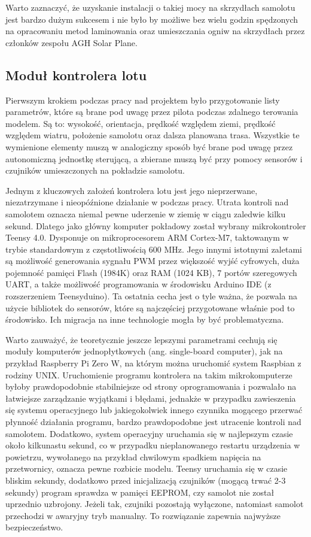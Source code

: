 \documentclass[12pt, a4paper]{article}
\begin{document}
Warto zaznaczyć, że uzyskanie instalacji o takiej mocy na skrzydłach samolotu jest bardzo dużym sukcesem i nie było by możliwe bez wielu godzin spędzonych na opracowaniu metod laminowania oraz umieszczania ogniw na skrzydłach przez członków zespołu AGH Solar Plane.

\FloatBarrier
\subsection{Moduł kontrolera lotu}
Pierwszym krokiem podczas pracy nad projektem  było przygotowanie listy parametrów, które są brane pod uwagę przez pilota podczas zdalnego terowania modelem. Są to: wysokość, orientacja, prędkość względem ziemi, prędkość względem wiatru, położenie samolotu oraz dalsza planowana trasa. Wszystkie te wymienione elementy muszą w analogiczny sposób być brane pod uwagę przez autonomiczną jednostkę sterującą, a zbierane muszą być przy pomocy sensorów i czujników umieszczonych na pokładzie samolotu. 

Jednym z kluczowych założeń kontrolera lotu jest jego nieprzerwane, niezatrzymane i nieopóźnione działanie w podczas pracy. Utrata kontroli nad samolotem oznacza niemal pewne uderzenie w ziemię w ciągu zaledwie kilku sekund. Dlatego jako główny komputer pokładowy został wybrany mikrokontroler Teensy 4.0. Dysponuje on mikroprocesorem ARM Cortex-M7, taktowanym w trybie standardowym z częstotliwością 600 MHz. Jego innymi istotnymi zaletami są możliwość generowania sygnału PWM przez większość wyjść cyfrowych, duża pojemność pamięci Flash (1984K) oraz RAM (1024 KB), 7 portów szeregowych UART, a także możliwość programowania w środowisku Arduino IDE (z rozszerzeniem Teensyduino). Ta ostatnia cecha jest o tyle ważna, że pozwala na użycie bibliotek do sensorów, które są najczęściej przygotowane właśnie pod to środowisko. Ich migracja na inne technologie mogła by być problematyczna. 

Warto zauważyć, że teoretycznie jeszcze lepszymi parametrami cechują się moduły komputerów jednopłytkowych (ang. single-board computer), jak na przykład Raspberry Pi Zero W, na którym można uruchomić system Raspbian z rodziny UNIX. Uruchomienie programu kontrolera na takim mikrokomputerze byłoby prawdopodobnie stabilniejsze od strony oprogramowania i pozwalało na łatwiejsze zarządzanie wyjątkami i błędami, jednakże w przypadku zawieszenia się systemu operacyjnego lub jakiegokolwiek innego czynnika mogącego przerwać płynność działania programu, bardzo prawdopodobne jest utracenie kontroli nad samolotem. Dodatkowo, system operacyjny uruchamia się w najlepszym czasie około kilkunastu sekund, co w przypadku nieplanowanego restartu urządzenia w powietrzu, wywołanego na przykład chwilowym spadkiem napięcia na przetwornicy, oznacza pewne rozbicie modelu. Teensy uruchamia się w czasie bliskim sekundy, dodatkowo przed inicjalizacją czujników (mogącą trwać 2-3 sekundy) program sprawdza w pamięci EEPROM, czy samolot nie został uprzednio uzbrojony. Jeżeli tak, czujniki pozostają wyłączone, natomiast samolot przechodzi w awaryjny tryb manualny. To rozwiązanie zapewnia najwyższe bezpieczeństwo.
\end{document}
